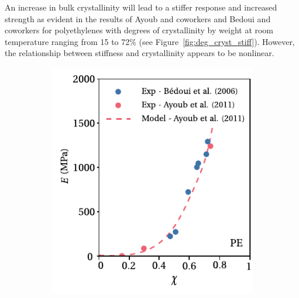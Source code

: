 An increase in bulk crystallinity will lead to a stiffer response and increased strength as evident in the results of Ayoub and coworkers \citep{ayoubEffectsCrystalContent2011} and Bedoui and coworkers \citep{bedouiMicromechanicalModelingIsotropic2006} for polyethylenes with degrees of crystallinity by weight at room temperature ranging from 15 to 72\% (see Figure~\ref{fig:deg_cryst_stiff}).
However, the relationship between stiffness and crystallinity appears to be nonlinear.
\begin{figure}[hbtp]
    \centering
    \begin{subfigure}[b]{0.45\textwidth}
                            \centering
                            \includegraphics[width=\textwidth]{figures/deg_cryst_stiff}
                            \caption{}
                            \label{subfig:deg_cryst_stiff}
            \end{subfigure} \hfill
            \begin{subfigure}[b]{0.45\textwidth}
                            \centering

\end{subfigure}
\end{figure}
